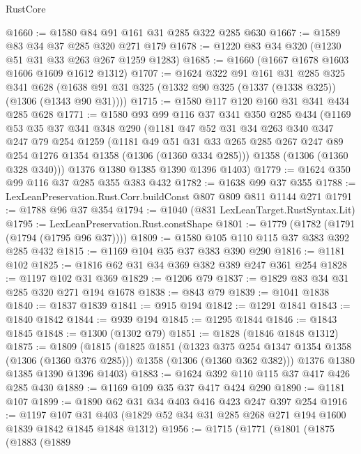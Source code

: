\begin{lexlean}{RustCore}
\begin{coremodule}
@1660 := @1580 @84 @91 @161 @31 @285 @322 @285 @630
@1667 := @1589 @83 @34 @37 @285 @320 @271 @179
@1678 := @1220 @83 @34 @320 (@1230 @51 @31 @33 @263 @267 @1259 @1283)
@1685 := @1660 (@1667 @1678 @1603 @1606 @1609 @1612 @1312)
@1707 := @1624
    @322
    @91
    @161
    @31
    @285
    @325
    @341
    @628
    (@1638 @91 @31 @325 (@1332 @90 @325 (@1337 (@1338 @325)) (@1306 (@1343 @90 @31))))
@1715 := @1580 @117 @120 @160 @31 @341 @434 @285 @628
@1771 := @1580
    @93
    @99
    @116
    @37
    @341
    @350
    @285
    @434
    (@1169
      @53
      @35
      @37
      @341
      @348
      @290
      (@1181
        @47
        @52
        @31
        @34
        @263
        @340
        @347
        @247
        @79
        @254
        @1259
        (@1181
          @49
          @51
          @31
          @33
          @265
          @285
          @267
          @247
          @89
          @254
          @1276
          @1354
          @1358
          (@1306 (@1360 @334 @285)))
        @1358
        (@1306 (@1360 @328 @340)))
      @1376
      @1380
      @1385
      @1390
      @1396
      @1403)
@1779 := @1624 @350 @99 @116 @37 @285 @355 @383 @432
@1782 := @1638 @99 @37 @355
@1788 := LexLeanPreservation.Rust.Corr.buildConst @807 @809 @811 @1144 @271
@1791 := @1788 @96 @37 @354
@1794 := @1040 (@831 LexLeanTarget.RustSyntax.Lit)
@1795 := LexLeanPreservation.Rust.constShape
@1801 := @1779 (@1782 (@1791 (@1794 (@1795 @96 @37))))
@1809 := @1580 @105 @110 @115 @37 @383 @392 @285 @432
@1815 := @1169 @104 @35 @37 @383 @390 @290
@1816 := @1181 @102
@1825 := @1816 @62 @31 @34 @369 @382 @389 @247 @361 @254
@1828 := @1197 @102 @31 @369
@1829 := @1206 @79
@1837 := @1829 @83 @34 @31 @285 @320 @271 @194 @1678
@1838 := @843 @79
@1839 := @1041 @1838
@1840 := @1837 @1839
@1841 := @915 @194
@1842 := @1291 @1841
@1843 := @1840 @1842
@1844 := @939 @194
@1845 := @1295 @1844
@1846 := @1843 @1845
@1848 := @1300 (@1302 @79)
@1851 := @1828 (@1846 @1848 @1312)
@1875 := @1809
    (@1815
      (@1825
        @1851
        (@1323 @375 @254 @1347 @1354 @1358 (@1306 (@1360 @376 @285)))
        @1358
        (@1306 (@1360 @362 @382)))
      @1376
      @1380
      @1385
      @1390
      @1396
      @1403)
@1883 := @1624 @392 @110 @115 @37 @417 @426 @285 @430
@1889 := @1169 @109 @35 @37 @417 @424 @290
@1890 := @1181 @107
@1899 := @1890 @62 @31 @34 @403 @416 @423 @247 @397 @254
@1916 := @1197
    @107
    @31
    @403
    (@1829 @52 @34 @31 @285 @268 @271 @194 @1600 @1839 @1842 @1845 @1848 @1312)
@1956 := @1715
    (@1771
      (@1801
        (@1875
          (@1883
            (@1889

\end{coremodule}
\end{lexlean}
